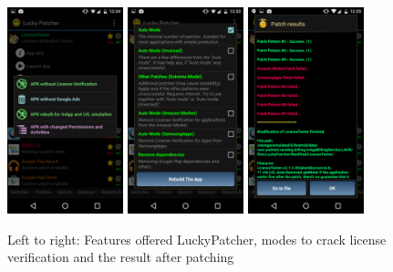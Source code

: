\begin{figure}[h]
    \centering
    \includegraphics[width=0.3\textwidth]{data/luckyFeatures.png}
    \includegraphics[width=0.3\textwidth]{data/luckyModi.png}
    \includegraphics[width=0.3\textwidth]{data/luckyPatching.png}
    \caption{Left to right: Features offered LuckyPatcher, modes to crack license verification and the result after patching}
    \label{fig:luckyScreen}
\end{figure}
